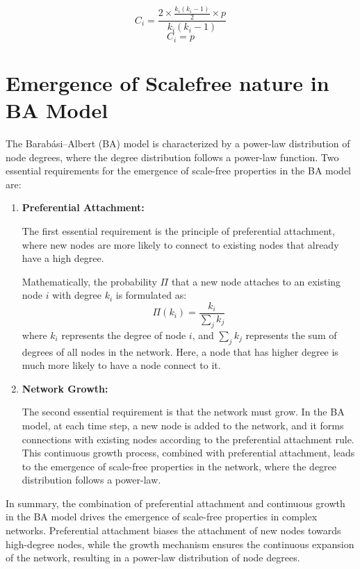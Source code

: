 \documentclass[11pt]{article}
\begin{document}
$$ C_i = \frac{2 \times \frac{k_i(k_i-1)}{2} \times p}{k_i(k_i-1)} $$
$$ C_i = p $$

\section{Emergence of Scalefree nature in BA Model}
The Barabási–Albert (BA) model is characterized by a power-law distribution of node degrees, where the degree distribution follows a power-law function. Two essential requirements for the emergence of scale-free properties in the BA model are:

\begin{enumerate}
    \item \textbf{Preferential Attachment:}
    
    The first essential requirement is the principle of preferential attachment, where new nodes are more likely to connect to existing nodes that already have a high degree. 
    
    Mathematically, the probability $\Pi$ that a new node attaches to an existing node $i$ with degree $k_i$ is formulated as:
    $$ \Pi(k_i) = \frac{k_i}{\sum_j k_j} $$
    where $k_i$ represents the degree of node $i$, and $\sum_j k_j$ represents the sum of degrees of all nodes in the network. Here, a node that has higher degree is much more likely to have a node connect to it.

    \item \textbf{Network Growth:}
    
    The second essential requirement is that the network must grow. In the BA model, at each time step, a new node is added to the network, and it forms connections with existing nodes according to the preferential attachment rule. This continuous growth process, combined with preferential attachment, leads to the emergence of scale-free properties in the network, where the degree distribution follows a power-law.
\end{enumerate}

In summary, the combination of preferential attachment and continuous growth in the BA model drives the emergence of scale-free properties in complex networks. Preferential attachment biases the attachment of new nodes towards high-degree nodes, while the growth mechanism ensures the continuous expansion of the network, resulting in a power-law distribution of node degrees.

\pagebreak
\nocite{*} %



\end{document}
